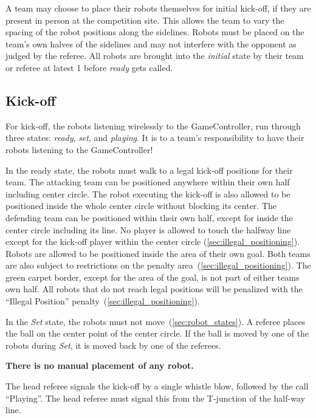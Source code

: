 A team may choose to place their robots themselves for initial kick-off, if they are present in person at the competition site. This allows the team to vary the spacing of the robot positions along the sidelines. Robots must be placed on the team's own halves of the sidelines and may not interfere with the opponent as judged by the referee. All robots are brought into the \textit{initial} state by their team or referee at latest \qty{1}{\min} before \textit{ready} gets called.

\subsection{Kick-off}
\label{sec:kick-off}
For kick-off, the robots listening wirelessly to the GameController, run through three states: \emph{ready}, \emph{set}, and \emph{playing}.
It is to a team's responsibility to have their robots listening to the GameController!

In the ready state, the robots must walk to a legal kick-off positions for their team.
The attacking team can be positioned anywhere within their own half including center circle. The robot executing the kick-off is also allowed to be positioned inside the whole center circle without blocking its center.
The defending team can be positioned within their own half, except for inside the center circle including its line.
No player is allowed to touch the halfway line except for the kick-off player within the center circle (\cf \cref{sec:illegal_positioning}). Robots are allowed to be positioned inside the area of their own goal.
Both teams are also subject to restrictions on the penalty area~(\cf \cref{sec:illegal_positioning}).
The green carpet border, except for the area of the goal, is not part of either teams own half. All robots that do not reach legal positions will be penalized with the ``Illegal Position'' penalty~(\cf \cref{sec:illegal_positioning}).

In the \emph{Set} state, the robots must not move~(\cf \cref{sec:robot_states}). A referee places the ball on the center point of the center circle. If the ball is moved by one of the robots during \textit{Set}, it is moved back by one of the referees.

\textbf{There is no manual placement of any robot.}

The head referee signals the kick-off by a single whistle blow, followed by the call ``Playing''. The head referee must signal this from the T-junction of the half-way line.

